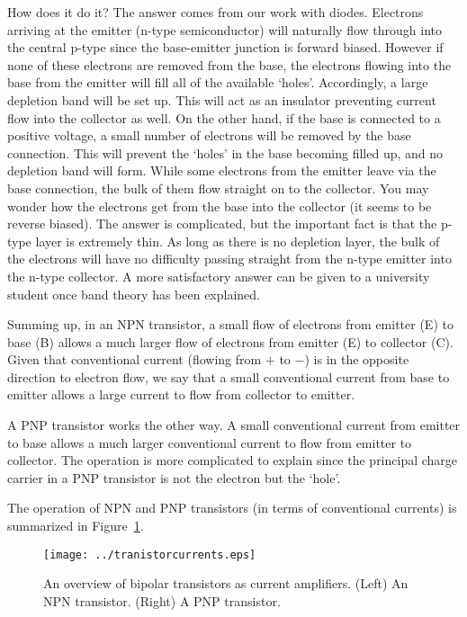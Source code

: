 How does it do it?  The answer comes from our work with diodes.  Electrons arriving at the emitter (n-type semiconductor) will naturally flow through into the central p-type since the base-emitter junction is forward biased.  However if none of these electrons are removed from the base, the electrons flowing into the base from the emitter will fill all of the available `holes'.  Accordingly, a large depletion band will be set up.  This will act as an insulator preventing current flow into the collector as well.  On the other hand, if the base is connected to a positive voltage, a small number of electrons will be removed by the base connection.  This will prevent the `holes' in the base becoming filled up, and no depletion band will form. While some electrons from the emitter leave via the base connection, the bulk of them flow straight on to the collector.  You may wonder how the electrons get from the base into the collector (it seems to be reverse biased).  The answer is complicated, but the important fact is that the p-type layer is extremely thin.  As long as there is no depletion layer, the bulk of the electrons will have no difficulty passing straight from the n-type emitter into the n-type collector.  A more satisfactory answer can be given to a university student once band theory has been explained.

Summing up, in an NPN transistor, a small flow of electrons from emitter (E) to base (B) allows a much larger flow of electrons from emitter (E) to collector (C).  Given that conventional current (flowing from $+$ to $-$) is in the opposite direction to electron flow, we say that a small conventional current from base to emitter allows a large current to flow from collector to emitter.

A PNP transistor works the other way.  A small conventional current from emitter to base allows a much larger conventional current to flow from emitter to collector.  The operation is more complicated to explain since the principal charge carrier in a PNP transistor is not the electron but the `hole'.

The operation of NPN and PNP transistors (in terms of conventional currents) is summarized in Figure~\ref{fig:transcur}.

\begin{figure}
\begin{center}
\texttt{[image: ../tranistorcurrents.eps]}
\caption{An overview of bipolar transistors as current amplifiers. (Left) An NPN transistor. (Right) A PNP transistor.}
\label{fig:transcur}
\end{center}
\end{figure}

